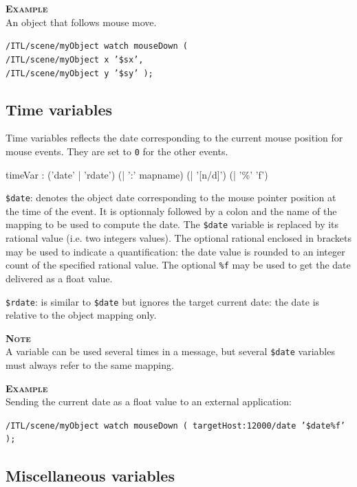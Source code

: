 \documentclass[a4paper,twoside]{report}
\newcommand{\subsublevel}[1]	{\subsection{#1}}
\newcommand{\OSC}[1]		{\texttt{#1}}
\newcommand{\values}[1]		{\texttt{#1}}
\newcommand{\example}		{\textbf{\hspace{-1.5cm}\textbf{\textsc{Example }}}}
\newcommand{\note}	[1]		{\vspace{2mm}\textbf{\hspace{-1.03cm}\textbf{\textsc{Note #1}}}}
\let\olditemize\itemize
\let\oldenditemize\enditemize
\renewenvironment{itemize} 	{\olditemize \setlength{\itemsep}{1mm}}{\oldenditemize}
\newcommand{\sample}	[1]			{\vspace{-2mm}\begin{center}\colorbox{mygrey}{
								\begin{minipage}[t]{0.9\columnwidth} 
								{\small \texttt{#1}}
								\end{minipage}}\end{center}}
\begin{document}
\example \\
An object that follows mouse move.\\
\sample{/ITL/scene/myObject watch mouseDown ( \\
\hspace*{3cm}/ITL/scene/myObject x '\$sx', \\
\hspace*{3cm}/ITL/scene/myObject y '\$sy' );}


\subsublevel{Time variables}
\label{timevar}

Time variables reflects the date corresponding to the current mouse position for mouse events. 
They are set to \values{0} for the other events. 

\begin{rail} 
timeVar :  ('date' | 'rdate') (| ':'  mapname) (| '[n/d]') (| '\%' 'f')
\end{rail}

\begin{itemize}
\item \OSC{\$date}: denotes the object date corresponding to the mouse pointer position at the time of the event. It is optionnaly followed by a colon and the name of the mapping to be used to compute the date. The \OSC{\$date} variable is replaced by its rational value (i.e. two integers values). The optional rational enclosed in brackets may be used to indicate a quantification: the date value is rounded to an integer count of the specified rational value. The optional \OSC{\%f} may be used to get the date delivered as a float value.
\item \OSC{\$rdate}: is similar to \OSC{\$date} but ignores the target current date: the date is relative to the object mapping only.
\end{itemize}

\note{} \\
A variable can be used several times in a message, but several \OSC{\$date} variables must always refer to the same mapping.

\example \\
Sending the current date as a float value to an external application:\\
\sample{/ITL/scene/myObject watch mouseDown ( targetHost:12000/date '\$date\%f' );}

\subsublevel{Miscellaneous variables}
\label{miscvar}
\end{document}
